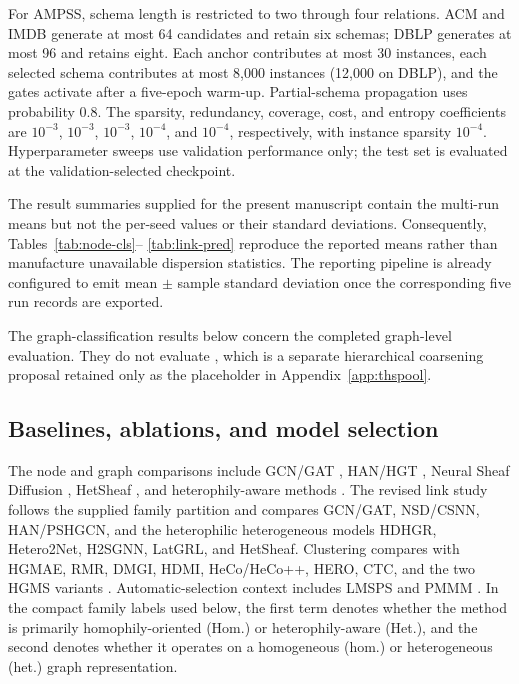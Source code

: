 For AMPSS, schema length is restricted to two through four relations. ACM and IMDB generate at
most 64 candidates and retain six schemas; DBLP generates at most 96 and retains eight. Each
anchor contributes at most 30 instances, each selected schema contributes at most 8,000 instances
(12,000 on DBLP), and the gates activate after a five-epoch warm-up. Partial-schema propagation
uses probability 0.8. The sparsity, redundancy, coverage, cost, and entropy coefficients are
$10^{-3}$, $10^{-3}$, $10^{-3}$, $10^{-4}$, and $10^{-4}$, respectively, with instance sparsity
$10^{-4}$. Hyperparameter sweeps use validation performance only; the test set is evaluated at the
validation-selected checkpoint.

The result summaries supplied for the present manuscript contain the multi-run means but not the
per-seed values or their standard deviations. Consequently, Tables~\ref{tab:node-cls}--
\ref{tab:link-pred} reproduce the reported means rather than manufacture unavailable dispersion
statistics. The reporting pipeline is already configured to emit mean $\pm$ sample standard
deviation once the corresponding five run records are exported.

The graph-classification results below concern the completed graph-level \method{} evaluation. They
do not evaluate \thspool{}, which is a separate hierarchical coarsening proposal retained only as
the placeholder in Appendix~\ref{app:thspool}.

\subsection{Baselines, ablations, and model selection}

The node and graph comparisons include GCN/GAT \cite{kipf2017gcn,velickovic2018gat}, HAN/HGT
\cite{wang2019han,hu2020hgt}, Neural Sheaf Diffusion \cite{bodnar2022neural}, HetSheaf
\cite{braithwaite2024hetsheaf}, and heterophily-aware methods
\cite{guo2023hdhgr,lu2024h2sgnn,shen2024latgrl}. The revised link study follows the supplied
family partition and compares GCN/GAT, NSD/CSNN, HAN/PSHGCN, and the heterophilic heterogeneous
models HDHGR, Hetero2Net, H2SGNN, LatGRL, and HetSheaf. Clustering compares with HGMAE, RMR,
DMGI, HDMI, HeCo/HeCo++, HERO, CTC, and the two HGMS variants \cite{wang2025hgms}.
Automatic-selection context includes LMSPS and PMMM \cite{yan2024lmsps,jiang2022pmmm}.
In the compact family labels used below, the first term denotes whether the method is primarily
homophily-oriented (Hom.) or heterophily-aware (Het.), and the second denotes whether it operates
on a homogeneous (hom.) or heterogeneous (het.) graph representation.

